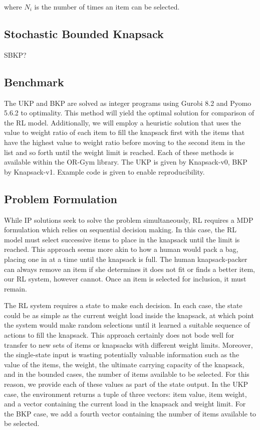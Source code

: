 \documentclass[12pt]{article}
\begin{document}
where $N_i$ is the number of times an item can be selected.

\subsection{Stochastic Bounded Knapsack}
SBKP?

\subsection{Benchmark}

The UKP and BKP are solved as integer programs using Gurobi 8.2 and Pyomo 5.6.2 to optimality.
This method will yield the optimal solution for comparison of the RL model. 
Additionally, we will employ a heuristic solution that uses the value to weight ratio of each item to fill the knapsack first with the items that have the highest value to weight ratio before moving to the second item in the list and so forth until the weight limit is reached.
Each of these methods is available within the OR-Gym library.
The UKP is given by Knapsack-v0, BKP by Knapsack-v1. 
Example code is given to enable reproducibility.

\subsection{Problem Formulation}

While IP solutions seek to solve the problem simultaneously, RL requires a MDP formulation which relies on sequential decision making.
In this case, the RL model must select successive items to place in the knapsack until the limit is reached.
This approach seems more akin to how a human would pack a bag, placing one in at a time until the knapsack is full.
The human knapsack-packer can always remove an item if she determines it does not fit or finds a better item, our RL system, however cannot.
Once an item is selected for inclusion, it must remain. 

The RL system requires a state to make each decision.
In each case, the state could be as simple as the current weight load inside the knapsack, at which point the system would make random selections until it learned a suitable sequence of actions to fill the knapsack.
This approach certainly does not bode well for transfer to new sets of items or knapsacks with different weight limits.
Moreover, the single-state input is wasting potentially valuable information such as the value of the items, the weight, the ultimate carrying capacity of the knapsack, and in the bounded cases, the number of items available to be selected.
For this reason, we provide each of these values as part of the state output.
In the UKP case, the environment returns a tuple of three vectors: item value, item weight, and a vector containing the current load in the knapsack and weight limit.
For the BKP case, we add a fourth vector containing the number of items available to be selected.
\end{document}
